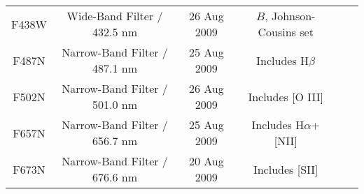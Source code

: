 \documentclass[11pt,fleqn]{book} %
\begin{document}
\begin{table}[h]
\begin{tabular}{ c c c c c c }
																																																																																																																																																																											    F438W & Wide-Band Filter / 432.5 nm & 26 Aug 2009 & $B$, Johnson-Cousins set\\
																																																																																																																																																																											        
																																																																																																																																																																												    F487N & Narrow-Band Filter / 487.1 nm & 25 Aug 2009 & Includes H$\beta$\\
																																																																																																																																																																												        
																																																																																																																																																																													    F502N & Narrow-Band Filter / 501.0 nm & 26 Aug 2009 & Includes \textsc{[O III]}\\
																																																																																																																																																																													        
																																																																																																																																																																														    F657N & Narrow-Band Filter / 656.7 nm & 25 Aug 2009 & Includes H$\alpha$+\textsc{[NII]}\\
																																																																																																																																																																														        
																																																																																																																																																																															    F673N & Narrow-Band Filter / 676.6 nm & 20 Aug 2009 & Includes \textsc{[SII]}\\
																																																																																																																																																																															        

\end{tabular}
\end{table}
\end{document}
